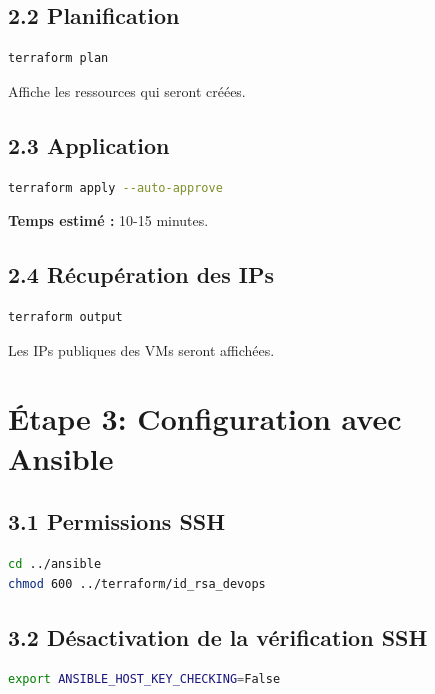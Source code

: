 \documentclass[12pt,a4paper,twoside]{report}
\begin{document}
\subsection{2.2 Planification}

\begin{lstlisting}[language=bash]
terraform plan
\end{lstlisting}

Affiche les ressources qui seront créées.

\subsection{2.3 Application}

\begin{lstlisting}[language=bash]
terraform apply --auto-approve
\end{lstlisting}

\textbf{Temps estimé :} 10-15 minutes.

\subsection{2.4 Récupération des IPs}

\begin{lstlisting}[language=bash]
terraform output
\end{lstlisting}

Les IPs publiques des VMs seront affichées.

\section{Étape 3: Configuration avec Ansible}

\subsection{3.1 Permissions SSH}

\begin{lstlisting}[language=bash]
cd ../ansible
chmod 600 ../terraform/id_rsa_devops
\end{lstlisting}

\subsection{3.2 Désactivation de la vérification SSH}

\begin{lstlisting}[language=bash]
export ANSIBLE_HOST_KEY_CHECKING=False
\end{lstlisting}
\end{document}
